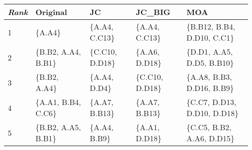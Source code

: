 \begin{tabular}{lllll}
	\toprule
	\textit{Rank} & Original             & JC               & JC\_BIG          & MOA                           \\
	\midrule
	1             & \{A.A4\}             & \{A.A4, C.C13\}  & \{A.A4, C.C13\}  & \{B.B12, B.B4, D.D10, C.C1\}  \\
	2             & \{B.B2, A.A4, B.B1\} & \{C.C10, D.D18\} & \{A.A6, D.D18\}  & \{D.D1, A.A5, D.D5, B.B10\}   \\
	3             & \{B.B2, A.A4\}       & \{A.A4, D.D4\}   & \{C.C10, D.D18\} & \{A.A8, B.B3, D.D16, B.B9\}   \\
	4             & \{A.A1, B.B4, C.C6\} & \{A.A7, B.B13\}  & \{A.A7, B.B13\}  & \{C.C7, D.D13, D.D10, D.D18\} \\
	5             & \{B.B2, A.A5, B.B1\} & \{A.A4, B.B9\}   & \{A.A1, D.D18\}  & \{C.C5, B.B2, A.A6, D.D15\}   \\
	\bottomrule
\end{tabular}

